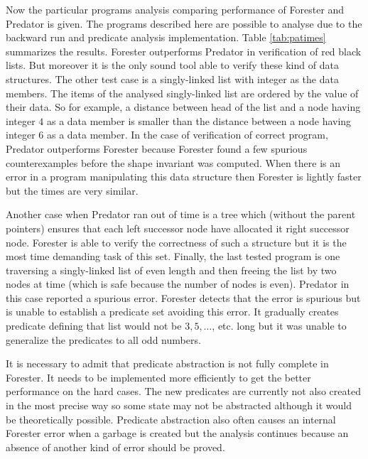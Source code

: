 Now the particular programs analysis comparing performance
of Forester and Predator is given.
The programs described here are possible to analyse due to the
backward run and predicate analysis implementation.
Table \ref{tab:patimes} summarizes the results.
Forester outperforms Predator in verification of red black lists.
But moreover it is the only sound tool able to verify these
kind of data structures.
The other test case is a singly-linked list with integer
as the data members.
The items of the analysed singly-linked list are ordered
by the value of their data.
So for example, a distance between head of the list and a 
node having integer $4$ as a data member is smaller than
the distance between a node having integer $6$ as a data member.
In the case of verification of correct program, Predator outperforms Forester
because Forester found a few spurious counterexamples
before the shape invariant was computed.
When there is an error in a program manipulating this
data structure then Forester is lightly faster
but the times are very similar.

Another case when Predator ran out of time
is a tree which (without the parent pointers) ensures
that each left successor node have allocated it
right successor node.
Forester is able to verify the correctness of such a structure
but it is the most time demanding task of this set.
Finally, the last tested program is one traversing
a singly-linked list of even length and then
freeing the list by two nodes at time (which is safe because
the number of nodes is even).
Predator in this case reported a spurious error.
Forester detects that the error is spurious but is
unable to establish a predicate set avoiding this error.
It gradually creates predicate defining that list would not
be $3, 5, \ldots$, etc. long but it was unable to generalize
the predicates to all odd numbers.

It is necessary to admit that predicate abstraction
is not fully complete in Forester.
It needs to be implemented more efficiently to get the better
performance on the hard cases.
The new predicates are currently not also created in the most
precise way so some state may not be abstracted
although it would be theoretically possible.
Predicate abstraction also often causes an internal
Forester error when a garbage is created but the
analysis continues because an absence of another
kind of error should be proved.

